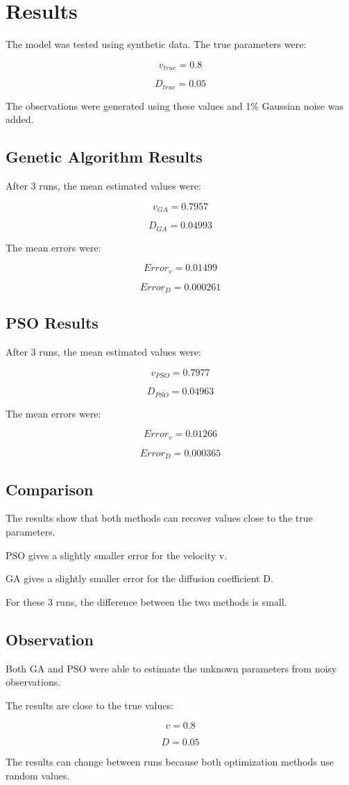 \section{Results}

The model was tested using synthetic data. The true parameters were:

\[
v_{true} = 0.8
\]

\[
D_{true} = 0.05
\]

The observations were generated using these values and 1\% Gaussian noise was added.

\subsection{Genetic Algorithm Results}

After 3 runs, the mean estimated values were:

\[
v_{GA} = 0.7957
\]

\[
D_{GA} = 0.04993
\]

The mean errors were:

\[
Error_v = 0.01499
\]

\[
Error_D = 0.000261
\]

\subsection{PSO Results}

After 3 runs, the mean estimated values were:

\[
v_{PSO} = 0.7977
\]

\[
D_{PSO} = 0.04963
\]

The mean errors were:

\[
Error_v = 0.01266
\]

\[
Error_D = 0.000365
\]

\subsection{Comparison}

The results show that both methods can recover values close to the true parameters.

PSO gives a slightly smaller error for the velocity v.

GA gives a slightly smaller error for the diffusion coefficient D.

For these 3 runs, the difference between the two methods is small.

\subsection{Observation}

Both GA and PSO were able to estimate the unknown parameters from noisy observations.

The results are close to the true values:

\[
v = 0.8
\]

\[
D = 0.05
\]

The results can change between runs because both optimization methods use random values.
